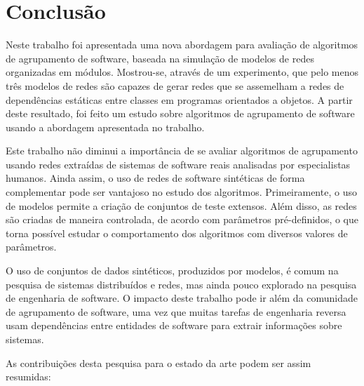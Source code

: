 

\chapter{Conclusão} \label{cap:conclusao}

Neste trabalho foi apresentada uma nova abordagem para avaliação de algoritmos de agrupamento de software, baseada na simulação de modelos de redes organizadas em módulos. Mostrou-se, através de um experimento, que pelo menos três modelos de redes são capazes de gerar redes que se assemelham a redes de dependências estáticas entre classes em programas orientados a objetos. A partir deste resultado, foi feito um estudo sobre algoritmos de agrupamento de software usando a abordagem apresentada no trabalho.

Este trabalho não diminui a importância de se avaliar algoritmos de agrupamento usando redes extraídas de sistemas de software reais analisadas por especialistas humanos. Ainda assim, o uso de redes de software sintéticas de forma complementar pode ser vantajoso no estudo dos algoritmos. Primeiramente, o uso de modelos permite a criação de conjuntos de teste extensos. Além disso, as redes são criadas de maneira controlada, de acordo com parâmetros pré-definidos, o que torna possível estudar o comportamento dos algoritmos com diversos valores de parâmetros.

O uso de conjuntos de dados sintéticos, produzidos por modelos, é comum na pesquisa de sistemas distribuídos e redes, mas ainda pouco explorado na pesquisa de engenharia de software. O impacto deste trabalho pode ir além da comunidade de agrupamento de software, uma vez que muitas tarefas de engenharia reversa usam dependências entre entidades de software para extrair informações sobre sistemas.

As contribuições desta pesquisa para o estado da arte podem ser assim resumidas:

